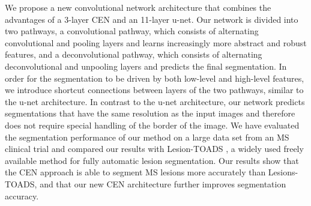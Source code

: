 We propose a new convolutional network architecture that combines the
advantages of a 3-layer CEN and an 11-layer u-net. Our network is divided into two
pathways, a convolutional pathway, which consists of alternating convolutional
and pooling layers and learns increasingly more abstract and robust features,
and a deconvolutional pathway, which consists of alternating deconvolutional and
unpooling layers and predicts the final segmentation. In order for the
segmentation to be driven by both low-level and high-level features, we
introduce shortcut connections between layers of the two pathways, similar to
the u-net architecture. In contrast to the u-net architecture, our network
predicts segmentations that have the same resolution as the input images and
therefore does not require special handling of the border of the image. We have
evaluated the segmentation performance of our method on a large data set from an
MS clinical trial and compared our results with Lesion-TOADS
\cite{shiee2010topology}, a widely used freely available method for fully
automatic lesion segmentation. Our results show that the CEN approach is able to
segment MS lesions more accurately than Lesions-TOADS, and that our new CEN
architecture further improves segmentation accuracy.




